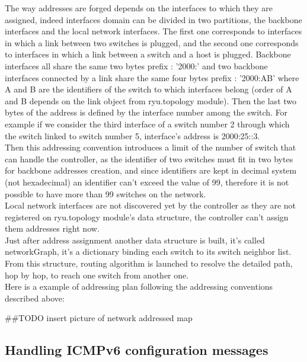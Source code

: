 \documentclass{article}
\begin{document}
The way addresses are forged depends on the interfaces to which they
are assigned, indeed interfaces domain can be divided in two
partitions, the backbone interfaces and the local network
interfaces. The first one corresponds to interfaces in which a link
between two switches is plugged, and the second one corresponds to
interfaces in which a link between a switch and a host is
plugged. Backbone interfaces all share the same two bytes prefix :
'2000:' and two backbone interfaces connected by a link share the same
four bytes prefix : '2000:AB' where A and B are the identifiers of the
switch to which interfaces belong (order of A and B depends on the
link object from ryu.topology module). Then the last two bytes of the
address is defined by the interface number among the switch. For
example if we consider the third interface of a switch number 2
through which the switch linked to switch number 5, interface's
address is 2000:25::3.\\
\newline
Then this addressing convention introduces a limit of the number of
switch that can handle the controller, as the identifier of two
switches must fit in two bytes for backbone addresses creation, and
since identifiers are kept in decimal system (not hexadecimal) an
identifier can't exceed the value of 99, therefore it is not possible
to have more than 99 switches on the network.\\
\newline
Local network interfaces are not discovered yet by the controller
as they are not registered on ryu.topology module's data structure,
the controller can't assign them addresses right now.\\
\newline
Just after address assignment another data structure is built, it's
called networkGraph, it's a dictionary binding each switch to its
switch neighbor list. From this structure, routing algorithm is
launched to resolve the detailed path, hop by hop, to reach one switch
from another one.\\
\newline
Here is a example of addressing plan following the addressing
conventions described above:

##TODO insert picture of network addressed map

\subsection{Handling ICMPv6 configuration messages}
\end{document}
